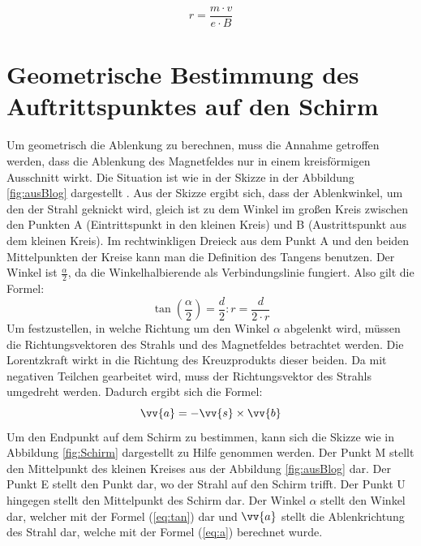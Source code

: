 \begin{equation}
     \label{eq:r}
     r = \frac{m \cdot v}{e \cdot B}
\end{equation}

\section{Geometrische Bestimmung des Auftrittspunktes auf den Schirm}


Um geometrisch die Ablenkung zu berechnen, muss die Annahme getroffen werden, dass die Ablenkung des Magnetfeldes nur in einem kreisförmigen Ausschnitt wirkt.
Die Situation ist wie in der Skizze in der Abbildung \ref{fig:ausBlog} dargestellt \cite{Blog}.
Aus der Skizze ergibt sich, dass der Ablenkwinkel, um den der Strahl geknickt wird, gleich ist zu dem Winkel im großen Kreis zwischen den Punkten A (Eintrittspunkt in den kleinen Kreis) und B (Austrittspunkt aus dem kleinen Kreis).
Im rechtwinkligen Dreieck aus dem Punkt A und den beiden Mittelpunkten der Kreise kann man die Definition des Tangens benutzen.
Der Winkel ist $\frac{\alpha}{2}$, da die Winkelhalbierende als Verbindungslinie fungiert.
Also gilt die Formel:
\begin{equation}
    \label{eq:tan}
    \tan(\frac{\alpha}{2}) = \frac{d}{2}:r = \frac{d}{2 \cdot r}
\end{equation}
Um festzustellen, in welche Richtung um den Winkel $\alpha$ abgelenkt wird, müssen die Richtungsvektoren des Strahls und des Magnetfeldes betrachtet werden.
Die Lorentzkraft wirkt in die Richtung des Kreuzprodukts dieser beiden.
Da mit negativen Teilchen gearbeitet wird, muss der Richtungsvektor des Strahls umgedreht werden. Dadurch ergibt sich die Formel: \begin{equation}
    \label{eq:a}
    \vv{a} = - \vv{s}\times \vv{b}
\end{equation}
Um den Endpunkt auf dem Schirm zu bestimmen, kann sich die Skizze wie in Abbildung \ref{fig:Schirm} dargestellt zu Hilfe genommen werden.
Der Punkt M stellt den Mittelpunkt des kleinen Kreises aus der Abbildung \ref{fig:ausBlog} dar.
Der Punkt E stellt den Punkt dar, wo der Strahl auf den Schirm trifft.
Der Punkt U hingegen stellt den Mittelpunkt des Schirm dar.
Der Winkel $\alpha$ stellt den Winkel dar, welcher mit der Formel (\ref{eq:tan}) dar und $\vv{a}$ stellt die Ablenkrichtung des Strahl dar, welche mit der Formel (\ref{eq:a}) berechnet wurde.
